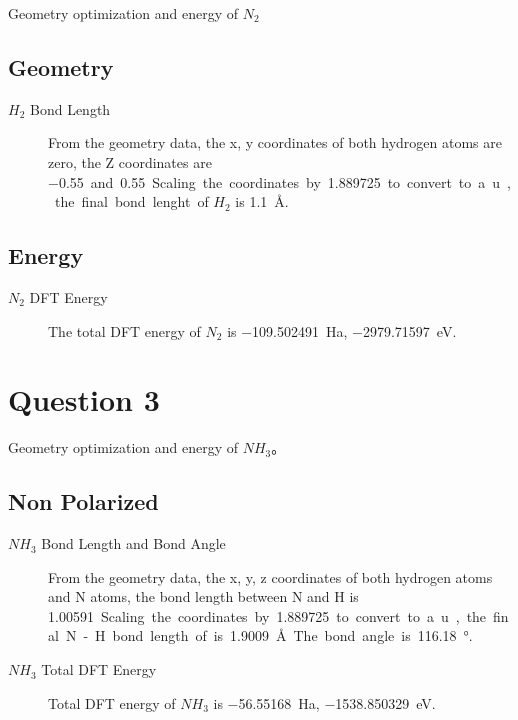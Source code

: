 \documentclass{article}
\begin{document}
Geometry optimization and energy of $N_{2}$

\subsection{Geometry}
\begin{description}
\item[$H_{2}$ Bond Length]
From the geometry data, the x, y coordinates of both hydrogen atoms are zero, the Z coordinates are \SI{-0.55} and \SI{0.55}. Scaling the coordinates by \SI{1.889725} to convert to a.u., the final bond lenght of $H_{2}$ is \SI{1.1}{\angstrom}. 
\end{description} 

\subsection{Energy}
\begin{description}
\item[$N_{2}$ DFT Energy]
The total DFT energy of $N_{2}$ is \SI{-109.502491}{Ha}, \SI{-2979.71597}{\eV}. 
\end{description}


\section{Question 3}

Geometry optimization and energy of $NH_{3}$。

\subsection{Non Polarized}
\begin{description}
\item[$NH_{3}$ Bond Length and Bond Angle]
From the geometry data, the x, y, z coordinates of both hydrogen atoms and N atoms, the bond length between N and H is \SI{1.00591}. Scaling the coordinates by \SI{1.889725} to convert to a.u., the final N-H bond length of is \SI{1.9009}{\angstrom}. The bond angle is \SI{116.18}{\degree}.
\item[$NH_{3}$ Total DFT Energy]
Total DFT energy of $NH_{3}$ is \SI{-56.55168}{Ha}, \SI{-1538.850329}{\eV}.	
\end{description} 
\end{document}
